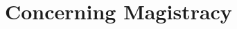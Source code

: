\documentclass[../main.tex]{subfiles}
\begin{document}
	
	\chapter{Concerning Magistracy}
	
	
	
	\theendnotes
	\setcounter{endnote}{0}
\end{document}
